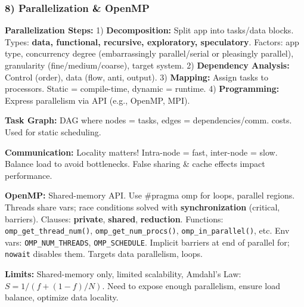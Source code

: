 \subsubsection*{8) Parallelization \& OpenMP}

\textbf{Parallelization Steps:}
1) \textbf{Decomposition:} Split app into tasks/data blocks. Types: \textbf{data, functional, recursive, exploratory, speculatory}. Factors: app type, concurrency degree (embarrassingly parallel/serial or pleasingly parallel), granularity (fine/medium/coarse), target system.  
2) \textbf{Dependency Analysis:} Control (order), data (flow, anti, output).  
3) \textbf{Mapping:} Assign tasks to processors. Static = compile-time, dynamic = runtime.  
4) \textbf{Programming:} Express parallelism via API (e.g., OpenMP, MPI).

\textbf{Task Graph:} DAG where nodes = tasks, edges = dependencies/comm. costs. Used for static scheduling.

\textbf{Communication:} Locality matters! Intra-node = fast, inter-node = slow. Balance load to avoid bottlenecks. False sharing \& cache effects impact performance.

\textbf{OpenMP:} Shared-memory API. Use \#pragma omp for loops, parallel regions. Threads share vars; race conditions solved with \textbf{synchronization} (critical, barriers).  
Clauses: \textbf{private}, \textbf{shared}, \textbf{reduction}.  
Functions: \texttt{omp\_get\_thread\_num()}, \texttt{omp\_get\_num\_procs()}, \texttt{omp\_in\_parallel()}, etc.  
Env vars: \texttt{OMP\_NUM\_THREADS}, \texttt{OMP\_SCHEDULE}.  
Implicit barriers at end of parallel for; \texttt{nowait} disables them.  
Targets data parallelism, loops.

\textbf{Limits:} Shared-memory only, limited scalability, Amdahl’s Law: $S = 1/(f + (1-f)/N)$. Need to expose enough parallelism, ensure load balance, optimize data locality.